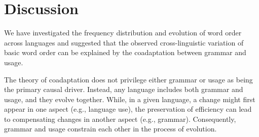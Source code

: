 \documentclass[11pt,a4paper]{article}
\begin{document}










\section*{Discussion}

We have investigated the frequency distribution and evolution of word order  across languages and suggested that the observed cross-linguistic variation of basic word order can be explained by the coadaptation between grammar and usage.



The theory of coadaptation does not privilege either grammar or usage as being the primary causal driver.
Instead, any language includes both grammar and usage, and they evolve together.
While, in a given language, a change might first appear in one aspect (e.g., language use), the preservation of efficiency can lead to compensating changes in another aspect (e.g., grammar).
Consequently, grammar and usage constrain each other in the process of evolution.
\end{document}
